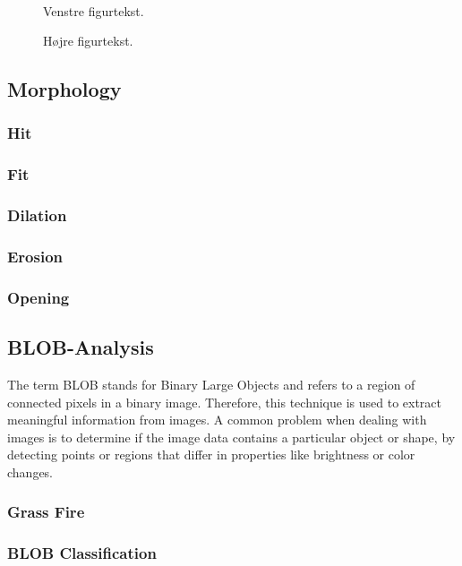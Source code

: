 \begin{figure}[htbp]
\begin{minipage}[b]{0.48\textwidth}
\end{minipage} \\ %
\begin{minipage}[t]{0.48\textwidth}
\caption{Venstre figurtekst.} %
\label{fig:billede1}
\end{minipage} \hfill
\begin{minipage}[t]{0.48\textwidth}
\caption{Højre figurtekst.} %
\label{fig:billede2}
\end{minipage}
\end{figure}

\subsection{Morphology}
\subsubsection{Hit}
\subsubsection{Fit}
\subsubsection{Dilation}
\subsubsection{Erosion}
\subsubsection{Opening}
\subsection{BLOB-Analysis}
The term BLOB stands for Binary Large Objects and refers to a region of connected pixels in a binary image. Therefore, this technique is used to extract meaningful information from images.
A common problem when dealing with images is to determine if the image data contains a particular object or shape, by detecting points or regions that differ in properties like brightness or color changes.
\subsubsection{Grass Fire}
\subsubsection{BLOB Classification}

